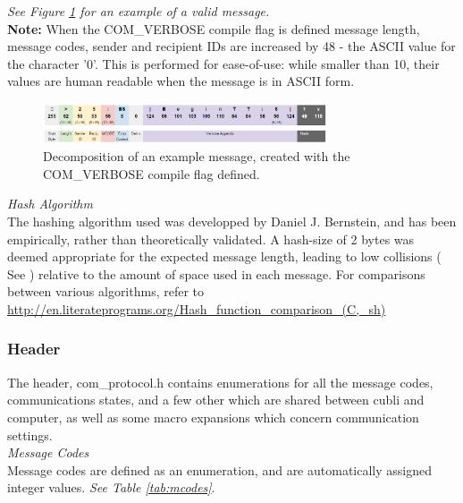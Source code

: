 \textit{See Figure \ref{img:Message} for an example of a valid message.}\\

\textbf{Note:} When the COM\_VERBOSE compile flag is defined message length, message codes, sender and recipient IDs are increased by 48 - the ASCII value for the character '0'. This is performed for ease-of-use: while smaller than 10, their values are human readable when the message is in ASCII form. \\

\begin{figure}[ht]
   \centering
   \includegraphics[width=0.75\textwidth]{img/Message.png}
   \caption{Decomposition of an example message, created with the COM\_VERBOSE compile flag defined.}
   \label{img:Message}
\end{figure}

\textit{Hash Algorithm}\\

The hashing algorithm used was developped by Daniel J. Bernstein, and has been empirically, rather than theoretically validated. A hash-size of 2 bytes was deemed appropriate for the expected message length, leading to low collisions ( See \cite{hashing} ) relative to the amount of space used in each message. For comparisons between various algorithms, refer to \url{http://en.literateprograms.org/Hash_function_comparison_(C,_sh)}

\subsubsection{Header}

The header, com\_protocol.h contains enumerations for all the message codes, communications states, and a few other which are shared between cubli and computer, as well as some macro expansions which concern communication settings.\\

\textit{Message Codes}\\

Message codes are defined as an enumeration, and are automatically assigned integer values. \textit{See Table \ref{tab:mcodes}}.\\

